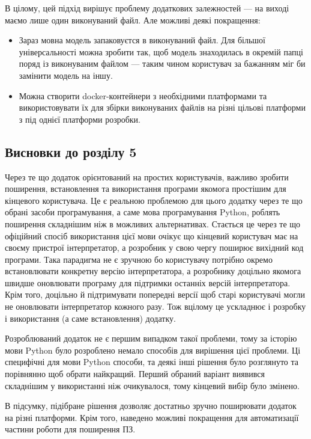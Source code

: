 \documentclass[14pt]{extarticle}
\newcommand{\unnumberedSubsection}[1]{%
  \subsection*{#1}%
  \addcontentsline{toc}{subsection}{#1}%
}
\begin{document}
  В цілому, цей підхід вирішує проблему додаткових залежностей ---
  на виході маємо лише один виконуваний файл. Але можливі деякі покращення:
  \begin{itemize}[labelindent=\dimexpr{}\relax, leftmargin=*]
    \item Зараз мовна модель запаковуєтся в виконуваний файл.
      Для більшої універсальності можна зробити так,
      щоб модель знаходилась в окремій папці поряд із виконуваним файлом ---
      таким чином користувач за бажанням міг би замінити модель на іншу.
    \item Можна створити docker-контейнери з необхідними платформами
    \cite{docker_windows,docker_windows_base, docker_osx}
      та використовувати їх для збірки виконуваних файлів на
      різні цільові платформи з під однієї платформи розробки.
  \end{itemize}

  \unnumberedSubsection{Висновки до розділу 5}
  Через те що додаток орієнтований на простих користувачів,
  важливо зробити поширення,
  встановлення та використання програми якомога простішим
  для кінцевого користувача. Це є реальною проблемою для цього додатку
  через те що обрані засоби програмування, а саме мова програмування Python,
  роблять поширення складнішим ніж в можливих альтернативах.
  Стається це через те що офіційний спосіб використання цієї мови
  очікує що кінцевий користувач має на своєму пристрої інтерпретатор,
  а розробник у свою чергу поширює вихідний код програми.
  Така парадигма не є зручною бо користувачу потрібно
  окремо встановлювати конкретну версію інтерпретатора,
  а розробнику доцільно якомога швидше оновлювати програму
  для підтримки останніх версій інтерпретатора. Крім того,
  доцільно й підтримувати попередні версії щоб старі користувачі
  могли не оновлювати інтерпретатор кожного разу.
  Тож вцілому це ускладнює і розробку і використання (а саме встановлення)
  додатку.

  Розроблюваний додаток не є першим випадком такої проблеми,
  тому за історію мови Python було розроблено немало способів для вирішення
  цієї проблеми. Ці специфічні для мови Python способи,
  та деякі інші рішення було розглянуто та порівнянно щоб обрати найкращий.
  Перший обраний варіант виявився складнішим у використанні ніж очикувалося,
  тому кінцевий вибір було змінено.

  В підсумку, підібране рішення дозволяє достатньо зручно поширювати
  додаток на різні платформи. Крім того,
  наведено можливі покращення для автоматизації частини роботи для поширення ПЗ.
\end{document}
